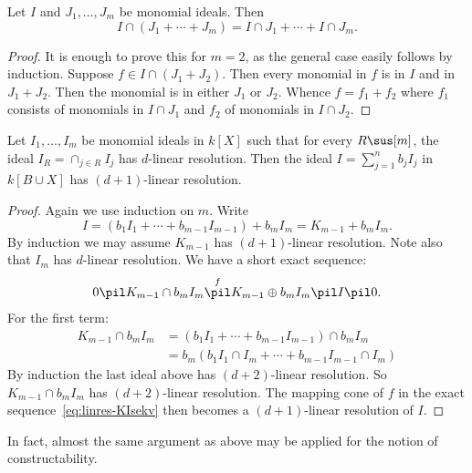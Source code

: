 \begin{lemma}
  Let $I$ and $J_1, \ldots, J_m$ be monomial ideals.
  Then
  \[ I \cap (J_1 + \cdots + J_m) = I \cap J_1 + \cdots + I \cap J_m. \]
\end{lemma}

\begin{proof}
  It is enough to prove this for $m = 2$, as the general case easily follows
  by induction. Suppose $f \in I \cap (J_1 + J_2)$. Then every monomial
  in $f$ is in $I$ and in $J_1 + J_2$. Then the monomial is in either
  $J_1$ or $J_2$. Whence $f = f_1 + f_2$ where $f_1$ consists of monomials
  in $I \cap J_1$ and $f_2$ of monomials in $I \cap J_2$.
\end{proof}

\begin{prop}
  Let $I_1, \ldots, I_m$ be monomial ideals in $k[X]$ such that for every
  $R \sus [m]$, the ideal $I_R = \cap_{j \in R} I_j$ has $d$-linear resolution.
  Then the ideal $I = \sum_{j=1}^n b_jI_j$ in $k[B \cup X]$ has
  $(d+1)$-linear resolution.
\end{prop}

\begin{proof}
  Again we use induction on $m$. Write
  \begin{equation} \label{eq:linres-KI}
    I = (b_1I_1 + \cdots + b_{m-1}I_{m-1}) + b_m I_m = K_{m-1} + b_mI_m.
    \end{equation}
    By induction we may assume $K_{m-1}$ has $(d+1)$-linear resolution. Note
    also that 
  $I_m$ has $d$-linear resolution. We have a short exact sequence:
  \begin{equation} \label{eq:linres-KIsekv}
    0 \pil K_{m-1} \cap b_mI_m \overset{f}\pil K_{m-1}
      \oplus b_m I_m \pil I \pil 0.
\end{equation}      
For the first term:
\begin{align*}
  K_{m-1} \cap b_mI_m&  = (b_1I_1 + \cdots + b_{m-1}I_{m-1}) \cap b_m I_m \\
                     &  = b_m(b_1I_1 \cap I_m + \cdots + b_{m-1} I_{m-1} \cap I_m)
\end{align*}
By induction the last ideal above has $(d+2)$-linear resolution. So
$K_{m-1} \cap b_m I_m$ has $(d+2)$-linear resolution. The mapping cone
of $f$ in the exact sequence~\eqref{eq:linres-KIsekv}
then becomes a $(d+1)$-linear resolution of $I$.
\end{proof}

In fact, almost the same argument as above may be applied for
the notion of constructability.

